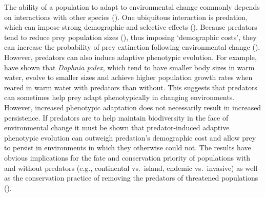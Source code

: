 \documentclass[11pt]{article}
\begin{document}
The ability of a population to adapt to environmental change commonly depends on interactions with other species (\citealt{Holt1990,Harrington1999,Tylianakis2008,Gilman2010,VanderPutten2010,Lavergne2010,Lawrence2012}).
One ubiquitous interaction is predation, which can impose strong demographic and selective effects
(\citealt{Dawkins1979,Abrams2000b,Reznick2008}). 
Because predators tend to reduce prey population sizes (\citealt{Holt2008b,Salo2010}), thus imposing `demographic costs', they can increase the probability of prey extinction following environmental change (\citealt{Schoener2001}).
However, predators can also induce adaptive phenotypic evolution.
For example, \cite{Tseng2015} have shown that \textit{Daphnia pulex}, which tend to have smaller body sizes in warm water, evolve to smaller sizes and achieve higher population growth rates when reared in warm water with predators than without.
This suggests that predators can sometimes help prey adapt phenotypically in changing environments.
However, increased phenotypic adaptation does not necessarily result in increased persistence.
If predators are to help maintain biodiversity in the face of environmental change it must be shown that predator-induced adaptive phenotypic evolution can outweigh predation's demographic cost and allow prey to persist in environments in which they otherwise could not.
The results have obvious implications for the fate and conservation priority of populations with and without predators (e.g., continental vs.\ island, endemic vs.\ invasive) as well as the conservation practice of removing the predators of threatened populations (\citealt{Reynolds1996,Smith2010}).
\end{document}
